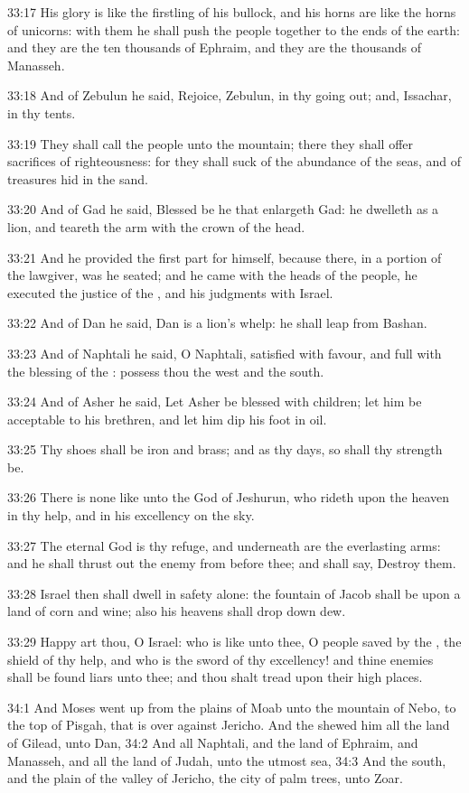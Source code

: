 33:17 His glory is like the firstling of his bullock, and his horns
are like the horns of unicorns: with them he shall push the people
together to the ends of the earth: and they are the ten thousands of
Ephraim, and they are the thousands of Manasseh.

33:18 And of Zebulun he said, Rejoice, Zebulun, in thy going out; and,
Issachar, in thy tents.

33:19 They shall call the people unto the mountain; there they shall
offer sacrifices of righteousness: for they shall suck of the
abundance of the seas, and of treasures hid in the sand.

33:20 And of Gad he said, Blessed be he that enlargeth Gad: he
dwelleth as a lion, and teareth the arm with the crown of the head.

33:21 And he provided the first part for himself, because there, in a
portion of the lawgiver, was he seated; and he came with the heads of
the people, he executed the justice of the \LORD, and his judgments
with Israel.

33:22 And of Dan he said, Dan is a lion's whelp: he shall leap from
Bashan.

33:23 And of Naphtali he said, O Naphtali, satisfied with favour, and
full with the blessing of the \LORD: possess thou the west and the
south.

33:24 And of Asher he said, Let Asher be blessed with children; let
him be acceptable to his brethren, and let him dip his foot in oil.

33:25 Thy shoes shall be iron and brass; and as thy days, so shall thy
strength be.

33:26 There is none like unto the God of Jeshurun, who rideth upon the
heaven in thy help, and in his excellency on the sky.

33:27 The eternal God is thy refuge, and underneath are the
everlasting arms: and he shall thrust out the enemy from before thee;
and shall say, Destroy them.

33:28 Israel then shall dwell in safety alone: the fountain of Jacob
shall be upon a land of corn and wine; also his heavens shall drop
down dew.

33:29 Happy art thou, O Israel: who is like unto thee, O people saved
by the \LORD, the shield of thy help, and who is the sword of thy
excellency! and thine enemies shall be found liars unto thee; and thou
shalt tread upon their high places.

34:1 And Moses went up from the plains of Moab unto the mountain of
Nebo, to the top of Pisgah, that is over against Jericho. And the \LORD
shewed him all the land of Gilead, unto Dan, 34:2 And all Naphtali,
and the land of Ephraim, and Manasseh, and all the land of Judah, unto
the utmost sea, 34:3 And the south, and the plain of the valley of
Jericho, the city of palm trees, unto Zoar.

